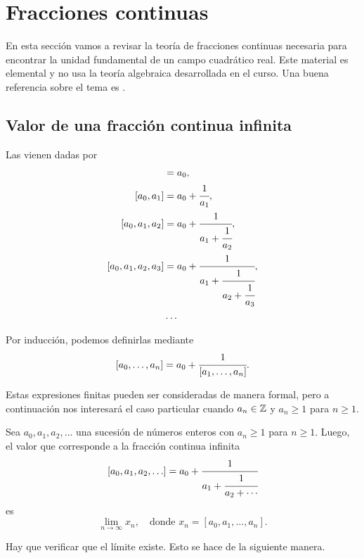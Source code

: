 \section{Fracciones continuas}

En esta sección vamos a revisar la teoría de fracciones continuas necesaria para
encontrar la unidad fundamental de un campo cuadrático real. Este material es
elemental y no usa la teoría algebraica desarrollada en el curso.
Una buena referencia sobre el tema es \cite{Khinchin-1997}.

\subsection{Valor de una fracción continua infinita}

Las  vienen dadas por
\begin{align*}
  [a_0] & = a_0, \\
  [a_0,a_1] & = a_0 + \cfrac{1}{a_1}, \\
  [a_0,a_1,a_2] & = a_0 + \cfrac{1}{a_1 + \cfrac{1}{a_2}}, \\
  [a_0,a_1,a_2,a_3] & = a_0 + \cfrac{1}{a_1 + \cfrac{1}{a_2 + \cfrac{1}{a_3}}}, \\
  & \ldots
\end{align*}

Por inducción, podemos definirlas mediante
$$[a_0, \ldots, a_n] = a_0 + \cfrac{1}{[a_1, \ldots, a_n]}.$$

Estas expresiones finitas pueden ser consideradas de manera formal, pero a
continuación nos interesará el caso particular cuando $a_n \in \mathbb{Z}$ y
$a_n \ge 1$ para $n \ge 1$.

\begin{definicion}
  Sea $a_0,a_1,a_2,\ldots$ una sucesión de números enteros con $a_n \ge 1$
  para $n \ge 1$. Luego, el valor que corresponde a la fracción continua
  infinita
  $$[a_0,a_1,a_2,\ldots] = a_0 + \cfrac{1}{a_1 + \cfrac{1}{a_2 + \cdots}}$$
  es
  $$\lim_{n\to\infty} x_n, \quad \text{donde } x_n = [a_0,a_1,\ldots,a_n].$$
\end{definicion}

Hay que verificar que el límite existe. Esto se hace de la siguiente manera.

